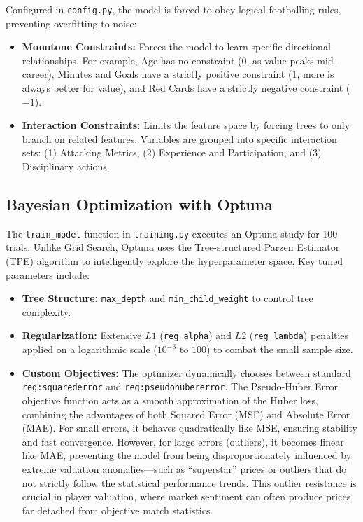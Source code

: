 \documentclass[a4paper,12pt]{report}
\begin{document}
Configured in \texttt{config.py}, the model is forced to obey logical footballing rules, preventing overfitting to noise:
\begin{itemize}
    \item \textbf{Monotone Constraints:} Forces the model to learn specific directional relationships. For example, Age has no constraint ($0$, as value peaks mid-career), Minutes and Goals have a strictly positive constraint ($1$, more is always better for value), and Red Cards have a strictly negative constraint ($-1$).
    \item \textbf{Interaction Constraints:} Limits the feature space by forcing trees to only branch on related features. Variables are grouped into specific interaction sets: (1) Attacking Metrics, (2) Experience and Participation, and (3) Disciplinary actions.
\end{itemize}

\subsection{Bayesian Optimization with Optuna}

The \texttt{train\_model} function in \texttt{training.py} executes an Optuna study for 100 trials. Unlike Grid Search, Optuna uses the Tree-structured Parzen Estimator (TPE) algorithm to intelligently explore the hyperparameter space. Key tuned parameters include:
\begin{itemize}
    \item \textbf{Tree Structure:} \texttt{max\_depth} and \texttt{min\_child\_weight} to control tree complexity.
    \item \textbf{Regularization:} Extensive $L1$ (\texttt{reg\_alpha}) and $L2$ (\texttt{reg\_lambda}) penalties applied on a logarithmic scale ($10^{-3}$ to $100$) to combat the small sample size.
    \item \textbf{Custom Objectives:} The optimizer dynamically chooses between standard \texttt{reg:squarederror} and \texttt{reg:pseudohubererror}. The Pseudo-Huber Error objective function acts as a smooth approximation of the Huber loss, combining the advantages of both Squared Error (MSE) and Absolute Error (MAE). For small errors, it behaves quadratically like MSE, ensuring stability and fast convergence. However, for large errors (outliers), it becomes linear like MAE, preventing the model from being disproportionately influenced by extreme valuation anomalies---such as ``superstar'' prices or outliers that do not strictly follow the statistical performance trends. This outlier resistance is crucial in player valuation, where market sentiment can often produce prices far detached from objective match statistics.
\end{itemize}
\end{document}
